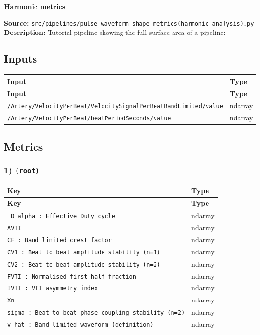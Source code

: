 \documentclass[11pt]{article}
\begin{document}
\begin{center}
\LARGE\textbf{Harmonic metrics}
\end{center}
\textbf{Source:} \texttt{src/\allowbreak{}pipelines/\allowbreak{}pulse\_\allowbreak{}waveform\_\allowbreak{}shape\_\allowbreak{}metrics(harmonic analysis).py}\\
\textbf{Description:} Tutorial pipeline showing the full surface area of a pipeline:

\subsection*{Inputs}
\begin{longtable}{|p{}|p{}|}
\hline
\textbf{Input} & \textbf{Type} \\ \hline
\endfirsthead
\hline
\textbf{Input} & \textbf{Type} \\ \hline
\endhead
{\scriptsize \texttt{/\allowbreak{}Artery/\allowbreak{}VelocityPerBeat/\allowbreak{}VelocitySignalPerBeatBandLimited/\allowbreak{}value}} & ndarray \\ \hline
{\scriptsize \texttt{/\allowbreak{}Artery/\allowbreak{}VelocityPerBeat/\allowbreak{}beatPeriodSeconds/\allowbreak{}value}} & ndarray \\ \hline
\end{longtable}

\subsection*{Metrics}
\subsubsection*{1) \texttt{(root)}}
\begin{longtable}{|p{}|p{}|}
\hline
\textbf{Key} & \textbf{Type} \\ \hline
\endfirsthead
\hline
\textbf{Key} & \textbf{Type} \\ \hline
\endhead
{\scriptsize \texttt{ D\_\allowbreak{}alpha : Effective Duty cycle }} & ndarray \\ \hline
{\scriptsize \texttt{AVTI}} & ndarray \\ \hline
{\scriptsize \texttt{CF : Band limited crest factor }} & ndarray \\ \hline
{\scriptsize \texttt{CV1 : Beat to beat amplitude stability (n=1)}} & ndarray \\ \hline
{\scriptsize \texttt{CV2 : Beat to beat amplitude stability (n=2)}} & ndarray \\ \hline
{\scriptsize \texttt{FVTI : Normalised first half fraction }} & ndarray \\ \hline
{\scriptsize \texttt{IVTI : VTI asymmetry index }} & ndarray \\ \hline
{\scriptsize \texttt{Xn}} & ndarray \\ \hline
{\scriptsize \texttt{sigma : Beat to beat phase coupling stability (n=2)}} & ndarray \\ \hline
{\scriptsize \texttt{v\_\allowbreak{}hat : Band limited waveform (definition)}} & ndarray \\ \hline
\end{longtable}
\end{document}
